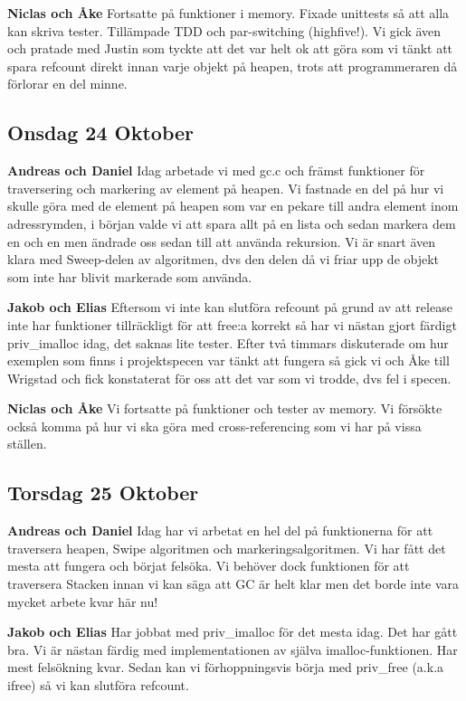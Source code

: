\documentclass{article}
\begin{document}
{\bf Niclas och Åke} Fortsatte på funktioner i memory. Fixade unittests så att alla kan skriva tester. Tillämpade TDD och par-switching (highfive!). Vi gick även och pratade med Justin som tyckte att det var helt ok att göra som vi tänkt att spara refcount direkt innan varje objekt på heapen, trots att programmeraren då förlorar en del minne.


\subsection{Onsdag 24 Oktober}
{\bf Andreas och Daniel} Idag arbetade vi med gc.c och främst funktioner för traversering och markering av element på heapen. Vi fastnade en del på hur vi skulle göra med de element på heapen som var en pekare till andra element inom adressrymden, i början valde vi att spara allt på en lista och sedan markera dem en och en men ändrade oss sedan till att använda rekursion. Vi är snart även klara med Sweep-delen av algoritmen, dvs den delen då vi friar upp de objekt som inte har blivit markerade som använda.

{\bf Jakob och Elias} Eftersom vi inte kan slutföra refcount på grund av att release inte har funktioner tillräckligt för att free:a korrekt så har vi nästan gjort färdigt priv\_imalloc idag, det saknas lite tester. Efter två timmars diskuterade om hur exemplen som finns i projektspecen var tänkt att fungera så gick vi och Åke till Wrigstad och fick konstaterat för oss att det var som vi trodde, dvs fel i specen.

{\bf Niclas och Åke} Vi fortsatte på funktioner och tester av memory. Vi försökte också komma på hur vi ska göra med cross-referencing som vi har på vissa ställen.

\subsection{Torsdag 25 Oktober}

{\bf Andreas och Daniel} Idag har vi arbetat en hel del på funktionerna för att traversera heapen, Swipe algoritmen och markeringsalgoritmen. Vi har fått det mesta att fungera och börjat felsöka. Vi behöver dock funktionen för att traversera Stacken innan vi kan säga att GC är helt klar men det borde inte vara mycket arbete kvar här nu!

{\bf Jakob och Elias} Har jobbat med priv\_imalloc för det mesta idag. Det har gått bra. Vi är nästan färdig med implementationen av själva imalloc-funktionen. Har mest felsökning kvar. Sedan kan vi förhoppningsvis börja med priv\_free (a.k.a ifree) så vi kan slutföra refcount.
\end{document}
